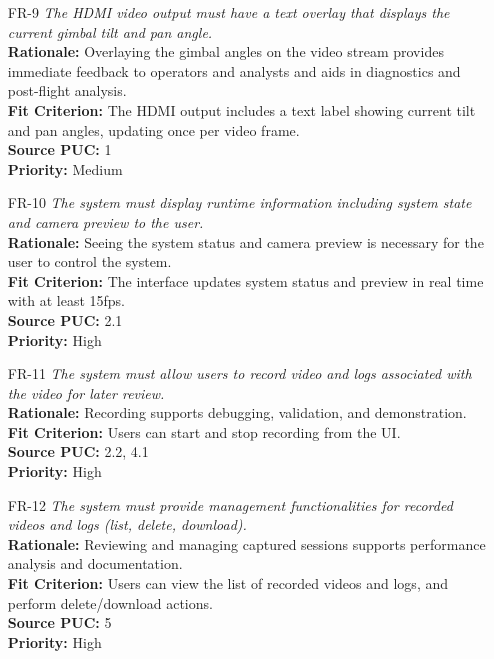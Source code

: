 \documentclass[12pt]{article}
\begin{document}
\begin{itemize}[leftmargin=*]
  \item[FR-9] \emph{The HDMI video output must have a text overlay that displays the
          current gimbal tilt and pan angle.}\\[2mm]
        \textbf{Rationale:} Overlaying the gimbal angles on the video stream provides immediate feedback to operators and analysts and aids in diagnostics and post-flight analysis.\\
        \textbf{Fit Criterion:} The HDMI output includes a text label showing current tilt and pan angles, updating once per video frame.\\
        \textbf{Source PUC:} 1 \\
        \textbf{Priority:} Medium

  \item[FR-10] \emph{The system must display runtime information including system state
          and camera preview to the user.}\\[2mm]
        \textbf{Rationale:} Seeing the system status and camera preview is necessary for the user to control the system.\\
        \textbf{Fit Criterion:} The interface updates system status and preview in real time with at least 15fps.\\
        \textbf{Source PUC:} 2.1 \\
        \textbf{Priority:} High

  \item[FR-11] \emph{The system must allow users to record video and logs associated
          with the video for later review.}\\[2mm]
        \textbf{Rationale:} Recording supports debugging, validation, and demonstration.\\
        \textbf{Fit Criterion:} Users can start and stop recording from the UI.\\
        \textbf{Source PUC:} 2.2, 4.1 \\
        \textbf{Priority:} High

  \item[FR-12] \emph{The system must provide management functionalities for recorded
          videos and logs (list, delete, download).}\\[2mm]
        \textbf{Rationale:} Reviewing and managing captured sessions supports performance analysis and documentation.\\
        \textbf{Fit Criterion:} Users can view the list of recorded videos and logs, and perform delete/download actions.\\
        \textbf{Source PUC:} 5 \\
        \textbf{Priority:} High

\end{itemize}
\end{document}
